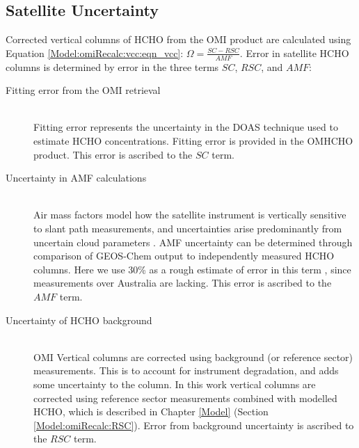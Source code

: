     
  \subsection{Satellite Uncertainty}
    \label{BioIsop:uncertainty:satellite}
    
    Corrected vertical columns of HCHO from the OMI product are calculated using Equation \ref{Model:omiRecalc:vcc:eqn_vcc}:
    $\Omega = \frac{SC - RSC}{AMF}$.
    Error in satellite HCHO columns is determined by error in the three terms $SC$, $RSC$, and $AMF$:
    \begin{description}
      \item [Fitting error from the OMI retrieval] \hfill \\
        Fitting error represents the uncertainty in the DOAS technique used to estimate HCHO concentrations.
        Fitting error is provided in the OMHCHO product.
        This error is ascribed to the $SC$ term.
      \item [Uncertainty in AMF calculations] \hfill \\
        Air mass factors model how the satellite instrument is vertically sensitive to slant path measurements, and uncertainties arise predominantly from uncertain cloud parameters \parencite{Palmer2006}.
        AMF uncertainty can be determined through comparison of GEOS-Chem output to independently measured HCHO columns.
        Here we use 30\% as a rough estimate of error in this term \parencite{Palmer2006}, since measurements over Australia are lacking.
        This error is ascribed to the $AMF$ term.
      \item [Uncertainty of HCHO background] \hfill \\
        OMI Vertical columns are corrected using background (or reference sector) measurements.
        This is to account for instrument degradation, and adds some uncertainty to the column.
        In this work vertical columns are corrected using reference sector measurements combined with modelled HCHO, which is described in Chapter \ref{Model} (Section \ref{Model:omiRecalc:RSC}).
        Error from background uncertainty is ascribed to the $RSC$ term.
    \end{description}

